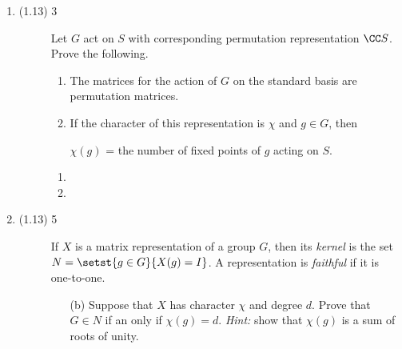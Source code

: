 \documentclass{math174}
\date{Monday, February 25}
\author{}
\begin{document}
\begin{enumerate}
\item
  \begin{description}
  \item[(1.13) 3] Let \(G\) act on \(S\) with corresponding permutation
    representation \(\CC S\). Prove the following.

    \begin{enumerate}
      \item The matrices for the action of \(G\) on the standard basis are
        permutation matrices.
      \item If the character of this representation is \(\chi\) and \(g \in G\),
        then
        \begin{center}
          \(\chi(g)\) = the number of fixed points of \(g\) acting on \(S\).
        \end{center}
    \end{enumerate}

    \begin{solution}
      \begin{enumerate}
        \item
        \item
      \end{enumerate}
    \end{solution}

  \end{description}
\item
  \begin{description}
  \item[(1.13) 5] If \(X\) is a matrix representation of a group \(G\),
    then its \emph{kernel} is the set \(N = \setst{g \in G}{X(g) = I}\).
    A representation is \emph{faithful} if it is one-to-one.

    \begin{enumerate}
      \item[(b)] Suppose that \(X\) has character \(\chi\) and degree \(d\).
        Prove that \(G \in N\) if an only if \(\chi(g) = d\). \emph{Hint:} show
        that \(\chi(g)\) is a sum of roots of unity.
    \end{enumerate}

    \begin{solution}

    \end{solution}
  \end{description}

\end{enumerate}
\end{document}
